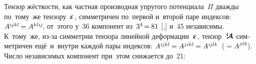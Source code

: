 \begin{otherlanguage}{russian}
\vspace{-0.1em} Тензор жёсткости, как частная производная упругого потенциала~$\Pi$ дважды по~тому~же тензору~$\mathboldepsilon$, симметричен по~первой и~второй паре индексов: ${A^{i\hspace{-0.1ex}jkl} \hspace{-0.16ex} = A^{kli\hspace{-0.1ex}j}\hspace{-0.25ex}}$, от~этого у~36 компонент из~${3^4 \hspace{-0.24ex}=\hspace{-0.12ex} 81}$ [,] и~45 независимы. К~тому~же, из\hbox{-}за симметрии тензора линейной деформации~$\mathboldepsilon$, тензор~$\hspace{.08ex}{^4\hspace{-0.72ex}\bm{\mathcal{A}}}\hspace{.08ex}$ симметричен ещё~и~внутри каждой пары индексов: ${A^{i\hspace{-0.1ex}jkl} \hspace{-0.16ex} = A^{jikl} \hspace{-0.16ex} = A^{i\hspace{-0.1ex}jlk}}$~(${= A^{jilk}}$). Число независимых компонент при~этом снижается до~21:


\end{otherlanguage}
